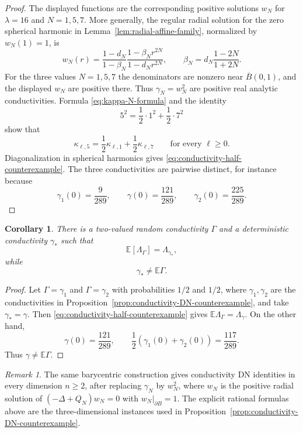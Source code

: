 \documentclass[11pt]{article}
\newcommand{\E}{\mathbb E}
\theoremstyle{plain}
\newtheorem{corollary}[theorem]{Corollary}
\theoremstyle{definition}
\theoremstyle{remark}
\newtheorem{remark}[theorem]{Remark}
\begin{document}
\begin{proof}
The displayed functions are the corresponding positive solutions $w_N$ for $\lambda=16$ and $N=1,5,7$.  More generally, the regular radial solution for the zero spherical harmonic in Lemma~\ref{lem:radial-affine-family}, normalized by $w_N(1)=1$, is
\[
  w_N(r)=\frac{1-d_N}{1-\beta_N}
  \frac{1-\beta_Nr^{2N}}{1-d_Nr^{2N}},
  \qquad
  \beta_N=d_N\frac{1-2N}{1+2N}.
\]
For the three values $N=1,5,7$ the denominators are nonzero near $\overline B(0,1)$, and the displayed $w_N$ are positive there.  Thus $\gamma_N=w_N^2$ are positive real analytic conductivities.  Formula \eqref{eq:kappa-N-formula} and the identity
\[
  5^2=\frac12\cdot1^2+\frac12\cdot7^2
\]
show that
\[
  \kappa_{\ell,5}=\frac12\kappa_{\ell,1}+\frac12\kappa_{\ell,7}
  \qquad\text{for every }\ell\ge0.
\]
Diagonalization in spherical harmonics gives \eqref{eq:conductivity-half-counterexample}.  The three conductivities are pairwise distinct, for instance because
\[
  \gamma_1(0)=\frac9{289},\qquad
  \gamma(0)=\frac{121}{289},\qquad
  \gamma_2(0)=\frac{225}{289}.
\]
\end{proof}

\begin{corollary}\label{cor:random-conductivity-mean-DN-deterministic}
There is a two-valued random conductivity $\Gamma$ and a deterministic conductivity $\gamma_*$ such that
\[
  \E[\Lambda_\Gamma]=\Lambda_{\gamma_*},
\]
while
\[
  \gamma_*\ne \E\Gamma.
\]
\end{corollary}

\begin{proof}
Let $\Gamma=\gamma_1$ and $\Gamma=\gamma_2$ with probabilities $1/2$ and $1/2$, where $\gamma_1,\gamma_2$ are the conductivities in Proposition~\ref{prop:conductivity-DN-counterexample}, and take $\gamma_*=\gamma$.  Then \eqref{eq:conductivity-half-counterexample} gives $\E\Lambda_\Gamma=\Lambda_\gamma$.  On the other hand,
\[
  \gamma(0)=\frac{121}{289},
  \qquad
  \frac12(\gamma_1(0)+\gamma_2(0))=\frac{117}{289}.
\]
Thus $\gamma\ne\E\Gamma$.
\end{proof}

\begin{remark}
The same barycentric construction gives conductivity DN identities in every dimension $n\ge2$, after replacing $\gamma_N$ by $w_N^2$, where $w_N$ is the positive radial solution of $(-\Delta+Q_N)w_N=0$ with $w_N|_{\partial B}=1$.  The explicit rational formulas above are the three-dimensional instances used in Proposition~\ref{prop:conductivity-DN-counterexample}.
\end{remark}
\end{document}
